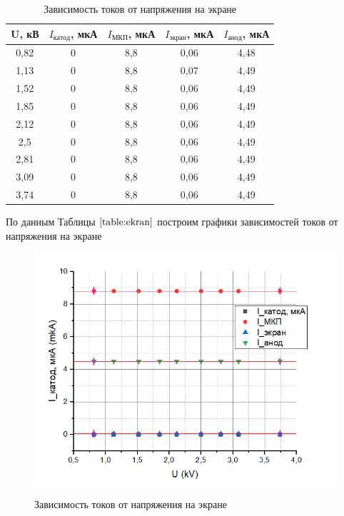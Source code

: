 \documentclass[a4paper,12pt]{article}
\begin{document}
\begin{table}[h]
\begin{center}
\caption{Зависимость токов от напряжения на экране}
\label{table:ekran}
\begin{tabular}{|c|c|c|c|c|}
\hline
{\textbf{U}, кВ} & \multicolumn{1}{c|}{\textbf{$I_{катод}$}, мкА} & \multicolumn{1}{c|}{\textbf{$I_{МКП}$}, мкА} & \multicolumn{1}{c|}{\textbf{$I_{экран}$}, мкА} & {\textbf{$I_{анод}$}, мкА} \\ \hline
0,82       & 0                 & 8,8             & 0,06              & 4,48             \\ \hline
1,13       & 0                 & 8,8             & 0,07              & 4,49             \\ \hline
1,52       & 0                 & 8,8             & 0,06              & 4,49             \\ \hline
1,85       & 0                 & 8,8             & 0,06              & 4,49             \\ \hline
2,12       & 0                 & 8,8             & 0,06              & 4,49             \\ \hline
2,5        & 0                 & 8,8             & 0,06              & 4,49             \\ \hline
2,81       & 0                 & 8,8             & 0,06              & 4,49             \\ \hline
3,09       & 0                 & 8,8             & 0,06              & 4,49             \\ \hline
3,74       & 0                 & 8,8             & 0,06              & 4,49             \\ \hline
\end{tabular}
\end{center}
\end{table}

По данным Таблицы $\ref{table:ekran}$ построим графики зависимостей токов от напряжения на экране

\begin{figure}[h!]
	\begin{center}
	\includegraphics[scale=1]{3}
	\label{graph:ekran}
	\caption{Зависимость токов от напряжения на экране}
	\end{center}
\end{figure}
\end{document}
